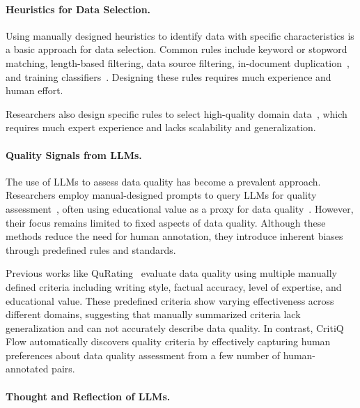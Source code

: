 \paragraph{Heuristics for Data Selection.}

Using manually designed heuristics to identify data with specific
characteristics is a basic approach for data selection. Common rules include keyword
or stopword matching, length-based filtering, data source filtering, in-document
duplication~\citep{dubey_llama_2024,cai_internlm2_2024}, and training
classifiers~\citep{noauthor_improving_2024,xie_data_2023, dubey_llama_2024, wei_arctic-snowcoder_2024,korbak_pretraining_2023,lv_longwanjuan_2024}.
Designing these rules requires much experience and human effort.

Researchers also design specific rules to select high-quality domain data~\citep{wang_generative_2023,lozhkov_starcoder_2024,huang_opencoder_2024},
which requires much expert experience and lacks scalability and generalization.

\paragraph{Quality Signals from LLMs.}

The use of LLMs to assess data quality has become a prevalent approach. Researchers
employ manual-designed prompts to query LLMs for quality assessment~\citep{dubey_llama_2024, sachdeva_how_2024,zhang_autonomous_2024},
often using educational value as a proxy for data quality~\citep{gunasekar_textbooks_2023, wei_arctic-snowcoder_2024}.
However, their focus remains limited to fixed aspects of data quality. Although these
methods reduce the need for human annotation, they introduce inherent biases
through predefined rules and standards.

Previous works like QuRating~\citep{wettig_qurating_2024} evaluate data quality using
multiple manually defined criteria including writing style, factual accuracy, level
of expertise, and educational value. These predefined criteria show varying effectiveness across
different domains, suggesting that manually summarized criteria lack generalization
and can not accurately describe data quality. In contrast, CritiQ Flow automatically
discovers quality criteria by effectively capturing human preferences about
data quality assessment from a few number of human-annotated pairs.

\paragraph{Thought and Reflection of LLMs.}

